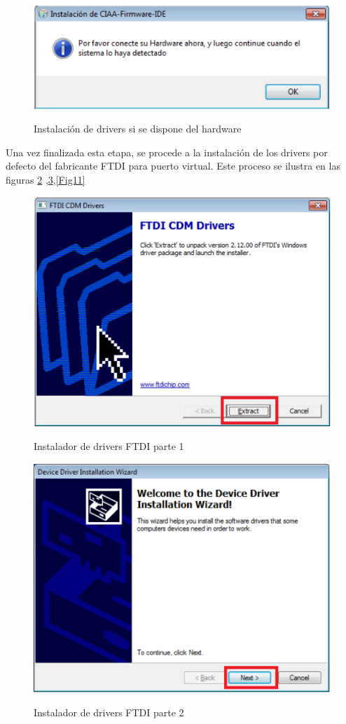 \documentclass[12pt,letterpaper]{article}
\begin{document}
\begin{center}
\begin{figure}[!h]
\centering
\includegraphics[width=8 cm]{figuras/instalacion6.png}\\
\caption{Instalación de drivers si se dispone del hardware}
\label{Fig8}
\end{figure}
\end{center}

Una vez finalizada esta etapa, se procede a la instalación de los drivers por defecto del fabricante FTDI para puerto virtual. Este proceso se ilustra en las figuras \ref{Fig9} ,\ref{Fig10},\ref{Fig11}

\begin{center}
\begin{figure}[!h]
\centering
\includegraphics[width=8 cm]{figuras/instalacion7.png}\\
\caption{Instalador de drivers FTDI parte 1}
\label{Fig9}
\end{figure}
\end{center}

\begin{center}
\begin{figure}[!h]
\centering
\includegraphics[width=8 cm]{figuras/instalacion8.png}\\
\caption{Instalador de drivers FTDI parte 2}
\label{Fig10}
\end{figure}
\end{center}
\end{document}
